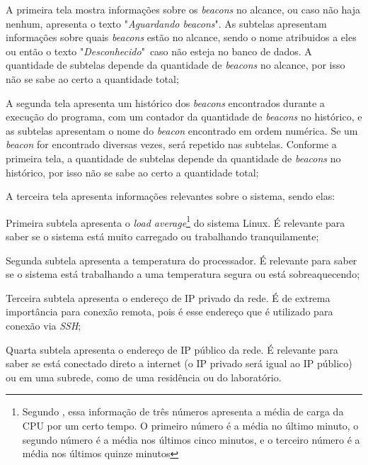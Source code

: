 \begin{alineas}
	\item A primeira tela mostra informações sobre os \textit{beacons} no alcance, ou caso não haja nenhum, apresenta o texto "\textit{Aguardando beacons}". As subtelas apresentam informações sobre quais \textit{beacons} estão no alcance, sendo o nome atribuidos a eles ou então o texto "\textit{Desconhecido}"\ caso não esteja no banco de dados. A quantidade de subtelas depende da quantidade de \textit{beacons} no alcance, por isso não se sabe ao certo a quantidade total;
	\item A segunda tela apresenta um histórico dos \textit{beacons} encontrados durante a execução do programa, com um contador da quantidade de \textit{beacons} no histórico, e as subtelas apresentam o nome do \textit{beacon} encontrado em ordem numérica. Se um \textit{beacon} for encontrado diversas vezes, será repetido nas subtelas. Conforme a primeira tela, a quantidade de subtelas depende da quantidade de \textit{beacons} no histórico, por isso não se sabe ao certo a quantidade total;
	\item A terceira tela apresenta informações relevantes sobre o sistema, sendo elas:
	\begin{subalineas}
		\item Primeira subtela apresenta o \textit{load average}\footnote{Segundo , essa informação de três números apresenta a média de carga da CPU por um certo tempo. O primeiro número é a média no último minuto, o segundo número é a média nos últimos cinco minutos, e o terceiro número é a média nos últimos quinze minutos} do sistema Linux. É relevante para saber se o sistema está muito carregado ou trabalhando tranquilamente;
		\item Segunda subtela apresenta a temperatura do processador. É relevante para saber se o sistema está trabalhando a uma temperatura segura ou está sobreaquecendo;
		\item Terceira subtela apresenta o endereço de IP privado da rede. É de extrema importância para conexão remota, pois é esse endereço que é utilizado para conexão via \textit{SSH};
		\item Quarta subtela apresenta o endereço de IP público da rede. É relevante para saber se está conectado direto a internet (o IP privado será igual ao IP público) ou em uma subrede, como de uma residência ou do laboratório.
	\end{subalineas}
\end{alineas}


